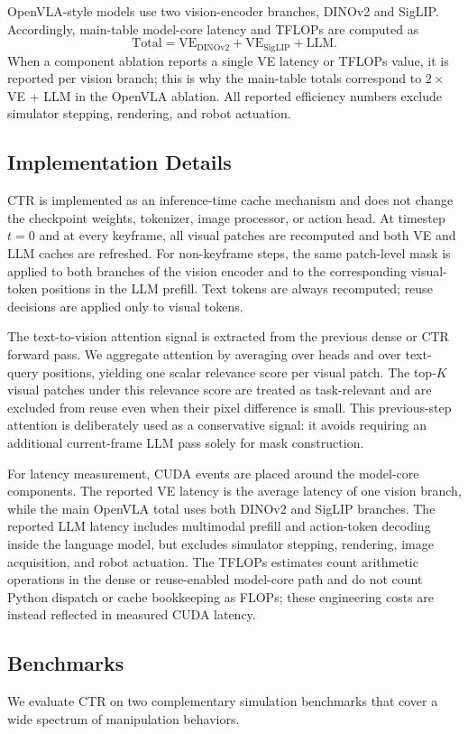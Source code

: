 OpenVLA-style models use two vision-encoder branches, DINOv2 and SigLIP.
Accordingly, main-table model-core latency and TFLOPs are computed as
\[
    \mathrm{Total} = \mathrm{VE}_{\mathrm{DINOv2}} + \mathrm{VE}_{\mathrm{SigLIP}} + \mathrm{LLM}.
\]
When a component ablation reports a single VE latency or TFLOPs value, it is reported per vision branch; this is why the main-table totals correspond to $2\times$VE + LLM in the OpenVLA ablation.
All reported efficiency numbers exclude simulator stepping, rendering, and robot actuation.

\subsection{Implementation Details}
CTR is implemented as an inference-time cache mechanism and does not change the checkpoint weights, tokenizer, image processor, or action head.
At timestep $t=0$ and at every keyframe, all visual patches are recomputed and both VE and LLM caches are refreshed.
For non-keyframe steps, the same patch-level mask is applied to both branches of the vision encoder and to the corresponding visual-token positions in the LLM prefill.
Text tokens are always recomputed; reuse decisions are applied only to visual tokens.

The text-to-vision attention signal is extracted from the previous dense or CTR forward pass.
We aggregate attention by averaging over heads and over text-query positions, yielding one scalar relevance score per visual patch.
The top-$K$ visual patches under this relevance score are treated as task-relevant and are excluded from reuse even when their pixel difference is small.
This previous-step attention is deliberately used as a conservative signal: it avoids requiring an additional current-frame LLM pass solely for mask construction.

For latency measurement, CUDA events are placed around the model-core components.
The reported VE latency is the average latency of one vision branch, while the main OpenVLA total uses both DINOv2 and SigLIP branches.
The reported LLM latency includes multimodal prefill and action-token decoding inside the language model, but excludes simulator stepping, rendering, image acquisition, and robot actuation.
The TFLOPs estimates count arithmetic operations in the dense or reuse-enabled model-core path and do not count Python dispatch or cache bookkeeping as FLOPs; these engineering costs are instead reflected in measured CUDA latency.

\subsection{Benchmarks}
We evaluate CTR on two complementary simulation benchmarks that cover a wide spectrum of manipulation behaviors.

